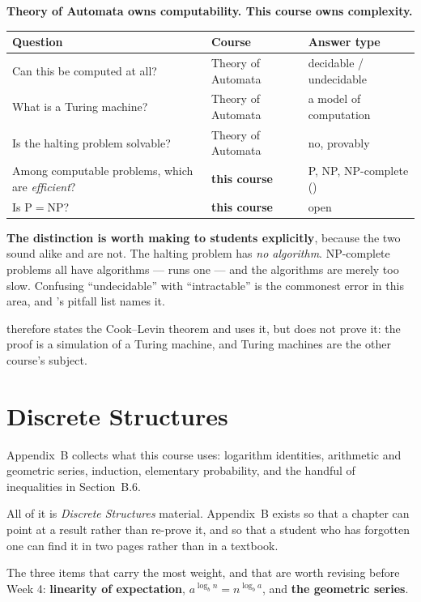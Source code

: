 \begin{conceptbox}
\textbf{Theory of Automata owns computability. This course owns complexity.}

\smallskip
{}
\begin{longtable}{@{}L{5.2cm}L{4.4cm}L{4.7cm}@{}}
\toprule
{}
\textbf{Question} & \textbf{Course} & \textbf{Answer type} \\
\midrule
\endhead
Can this be computed at all? & Theory of Automata & decidable / undecidable \\
What is a Turing machine? & Theory of Automata & a model of computation \\
Is the halting problem solvable? & Theory of Automata & no, provably \\
Among computable problems, which are \emph{efficient}? & \textbf{this course} &
  P, NP, NP-complete () \\
Is $\mathrm{P} = \mathrm{NP}$? & \textbf{this course} & open \\
\bottomrule
\end{longtable}

\smallskip
\textbf{The distinction is worth making to students explicitly}, because the
two sound alike and are not. The halting problem has \emph{no algorithm}.
NP-complete problems all have algorithms ---  runs one --- and
the algorithms are merely too slow. Confusing ``undecidable'' with
``intractable'' is the commonest error in this area, and 's
pitfall list names it.

\smallskip
{} therefore states the Cook--Levin theorem and uses it, but
does not prove it: the proof is a simulation of a Turing machine, and Turing
machines are the other course's subject.
\end{conceptbox}

\section{Discrete Structures}

\begin{conceptbox}
Appendix~B collects what this course uses: logarithm identities, arithmetic and
geometric series, induction, elementary probability, and the handful of
inequalities in Section~B.6.

\smallskip
All of it is \emph{Discrete Structures} material. Appendix~B exists so that a
chapter can point at a result rather than re-prove it, and so that a student
who has forgotten one can find it in two pages rather than in a textbook.

\smallskip
The three items that carry the most weight, and that are worth revising before
Week 4: \textbf{linearity of expectation}, \textbf{$a^{\log_{b}n} =
n^{\log_{b}a}$}, and \textbf{the geometric series}.
\end{conceptbox}

